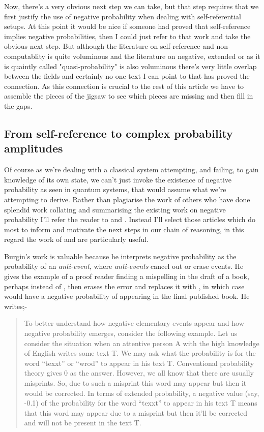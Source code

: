 Now, there's a very obvious next step we can take, but that step requires that we first justify the use of negative probability when dealing with self-referential setups. At this point it would be nice if someone had proved that self-reference implies negative probabilities, then I could just refer to that work and take the obvious next step. But although the literature on self-reference and non-computablity is quite voluminous and the literature on negative, extended or as it is quaintly called "quasi-probability" is also voluminous there's very little overlap between the fields and certainly no one text I can point to that has proved the connection. As this connection is crucial to the rest of this article we have to assemble the pieces of the jigsaw to see which pieces are missing and then fill in the gaps.

\subsection{From self-reference to complex probability amplitudes}
\label{sec:self-reference}\label{sec:contextuality}
Of course as we're dealing with a classical system attempting, and failing, to gain knowledge of its own state, we can't just invoke the existence of negative probability as seen in quantum systems, that would assume what we're attempting to derive. Rather than plagiarise the work of others who have done splendid work collating and summarising the existing work on negative probability I'll refer the reader to \autocite{burgin_2009, burgin2010interpretations} and \autocite{muckenheim_1986}. Instead I'll select those articles which do most to inform and motivate the next steps in our chain of reasoning, in this regard the work of \autocite{burgin2010interpretations} and \autocite{aaronson_lect9,Aaronson:dem} are particularly useful. 

Burgin's work is valuable because he interprets negative probability as the probability of an \emph{anti-event}, where \emph{anti-events} cancel out or erase events. He gives the example of a proof reader finding a mispelling in the draft of a book, perhaps  instead of , then erases the error and replaces it with , in which case  would have a negative probability of appearing in the final published book.
He writes;-
\begin{quotation}
    To better understand how negative elementary events appear and how negative probability emerges, consider the following example. Let us consider the situation when an attentive person A with the high knowledge of English writes some text T. We may ask what the probability is for the word “texxt” or “wrod” to appear in his text T. Conventional probability theory gives 0 as the answer. However, we all know that there are usually misprints. So, due to such a misprint this word may appear but then it would be corrected. In terms of extended probability, a negative value (say, -0.1) of the probability for the word “texxt” to appear in his text T means that this word may appear due to a misprint but then it’ll be corrected and will not be present in the text T. 
    \hfill \autocite{burgin2010interpretations}
\end{quotation}

